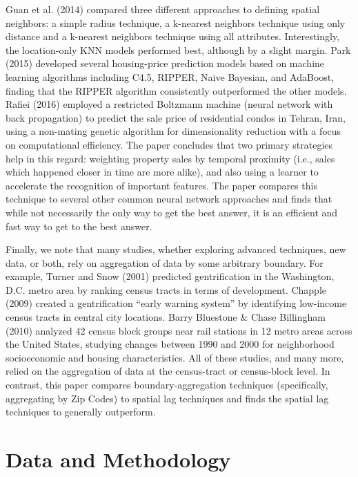 \documentclass[12pt,]{article}
\begin{document}
Guan et al. (2014) compared three different approaches to defining
spatial neighbors: a simple radius technique, a k-nearest neighbors
technique using only distance and a k-nearest neighbors technique using
all attributes. Interestingly, the location-only KNN models performed
best, although by a slight margin. Park (2015) developed several
housing-price prediction models based on machine learning algorithms
including C4.5, RIPPER, Naive Bayesian, and AdaBoost, finding that the
RIPPER algorithm consistently outperformed the other models. Rafiei
(2016) employed a restricted Boltzmann machine (neural network with back
propagation) to predict the sale price of residential condos in Tehran,
Iran, using a non-mating genetic algorithm for dimensionality reduction
with a focus on computational efficiency. The paper concludes that two
primary strategies help in this regard: weighting property sales by
temporal proximity (i.e., sales which happened closer in time are more
alike), and also using a learner to accelerate the recognition of
important features. The paper compares this technique to several other
common neural network approaches and finds that while not necessarily
the only way to get the best answer, it is an efficient and fast way to
get to the best answer.

Finally, we note that many studies, whether exploring advanced
techniques, new data, or both, rely on aggregation of data by some
arbitrary boundary. For example, Turner and Snow (2001) predicted
gentrification in the Washington, D.C. metro area by ranking census
tracts in terms of development. Chapple (2009) created a gentrification
``early warning system'' by identifying low-income census tracts in
central city locations. Barry Bluestone \& Chase Billingham (2010)
analyzed 42 census block groups near rail stations in 12 metro areas
across the United States, studying changes between 1990 and 2000 for
neighborhood socioeconomic and housing characteristics. All of these
studies, and many more, relied on the aggregation of data at the
census-tract or census-block level. In contrast, this paper compares
boundary-aggregation techniques (specifically, aggregating by Zip Codes)
to spatial lag techniques and finds the spatial lag techniques to
generally outperform.

\hypertarget{data-and-methodology}{%
\section{Data and Methodology}\label{data-and-methodology}}
\end{document}
